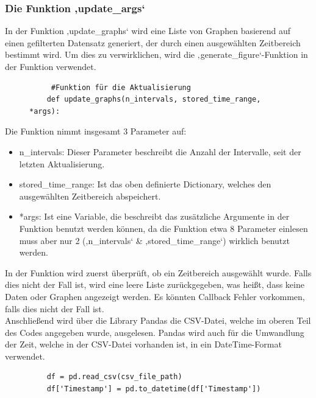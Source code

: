 \subsubsection{Die Funktion ‚update\_args‘}
In der Funktion ‚update\_graphs‘ wird eine Liste von Graphen basierend auf einen gefilterten Datensatz generiert, der durch einen ausgewählten Zeitbereich bestimmt wird. Um dies zu verwirklichen, wird die ‚generate\_figure‘-Funktion in der Funktion verwendet.
\vspace{3mm}
\begin{figure}[H]
    \centering
    \begin{verbatim}
     #Funktion für die Aktualisierung
    def update_graphs(n_intervals, stored_time_range, *args):
    \end{verbatim}
\end{figure}
Die Funktion nimmt insgesamt 3 Parameter auf: 
\begin{itemize}
    \item n\_intervals:  Dieser Parameter beschreibt die Anzahl der Intervalle, seit der letzten Aktualisierung.
    \item stored\_time\_range: Ist das oben definierte Dictionary, welches den ausgewählten Zeitbereich abspeichert.
    \item *args: Ist eine Variable, die beschreibt das zusätzliche Argumente in der Funktion benutzt werden können, da die Funktion etwa 8 Parameter einlesen muss aber nur 2 (‚n\_intervals‘ \& ‚stored\_time\_range‘) wirklich benutzt werden. 
\end{itemize}
\vspace{3mm}
In der Funktion wird zuerst überprüft, ob ein Zeitbereich ausgewählt wurde. Falls dies nicht der Fall ist, wird eine leere Liste zurückgegeben, was heißt, dass keine Daten oder Graphen angezeigt werden. Es könnten Callback Fehler vorkommen, falls dies nicht der Fall ist. \\
\vspace{3mm}
Anschließend wird über die Library Pandas die CSV-Datei, welche im oberen Teil des Codes angegeben wurde, ausgelesen. Pandas wird auch für die Umwandlung der Zeit, welche in der CSV-Datei vorhanden ist, in ein DateTime-Format verwendet.\\
\vspace{3mm}
\begin{figure}[H]
    \centering
    \begin{verbatim}
    df = pd.read_csv(csv_file_path)
    df['Timestamp'] = pd.to_datetime(df['Timestamp'])
    \end{verbatim}
\end{figure}

